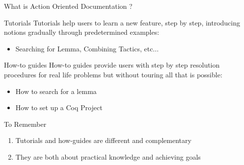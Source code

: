 \documentclass[10pt]{beamer}
\begin{document}
\begin{frame}{What is Action Oriented Documentation ?}
  \vspace*{-4pt}
  \begin{tcbProp}{Tutorials}
    Tutorials help users to learn a new feature, step by step, introducing
    notions gradually through predetermined examples:
    \begin{itemize}[label=$\hookrightarrow$]
      \item<2-> Searching for Lemma, Combining Tactics, etc...
    \end{itemize}
  \end{tcbProp}
  \vspace*{-4pt}
  \begin{tcbProp}{How-to guides}
    How-to guides provide users with step by step resolution procedures for real
    life problems but without touring all that is possible:
    \begin{itemize}[label=$\hookrightarrow$]
      \item<4-> How to search for a lemma
      \item<5-> How to set up a Coq Project
    \end{itemize}
  \end{tcbProp}
  \vspace*{-4pt}
  \begin{tcbSol}{To Remember}
    \begin{enumerate}
      \item Tutorials and how-guides are different and complementary
      \item They are both about practical knowledge and achieving goals
    \end{enumerate}
  \end{tcbSol}
\end{frame}
\end{document}
